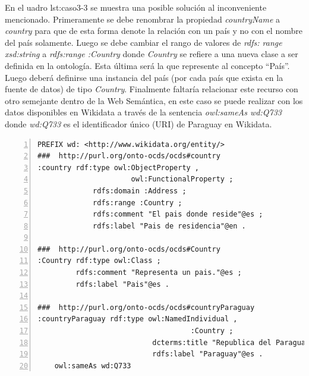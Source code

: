  En el uadro {lst:caso3-3} se muestra una posible solución al inconveniente mencionado. Primeramente se debe renombrar la propiedad \textit{countryName} a \textit{country} para que de esta forma denote la relación con un país y no con el nombre del país solamente. Luego se debe cambiar el rango de valores de \textit{rdfs: range xsd:string}  a \textit{rdfs:range :Country }donde \textit{Country} se refiere a una nueva clase a ser definida en la ontología. Esta última será la que represente al concepto “País”. Luego deberá definirse una instancia del país (por cada país que exista en la fuente de datos) de tipo \textit{Country}. Finalmente faltaría relacionar este recurso con otro semejante dentro de la Web Semántica, en este caso se puede realizar con los datos disponibles en Wikidata a través de la sentencia \textit{owl:sameAs wd:Q733} donde \textit{wd:Q733} es el identificador único (URI) de Paraguay en Wikidata.\hfill \break

\noindent\begin{minipage}[c]{\textwidth}
 \begin{lstlisting}[captionpos=b, caption=Declaracion de la Clase Country, label={lst:caso3-3},  numbers=left,  numberstyle=\tiny\color{mygray},
    basicstyle=\footnotesize\ttfamily,frame=single]
PREFIX wd: <http://www.wikidata.org/entity/>
###  http://purl.org/onto-ocds/ocds#country
:country rdf:type owl:ObjectProperty ,
                      owl:FunctionalProperty ;
             rdfs:domain :Address ;
             rdfs:range :Country ;
             rdfs:comment "El pais donde reside"@es ;
             rdfs:label "Pais de residencia"@en .

###  http://purl.org/onto-ocds/ocds#Country
:Country rdf:type owl:Class ;
         rdfs:comment "Representa un pais."@es ;
         rdfs:label "Pais"@es .

###  http://purl.org/onto-ocds/ocds#countryParaguay
:countryParaguay rdf:type owl:NamedIndividual ,
                                    :Country ;
                           dcterms:title "Republica del Paraguay"@es ;
                           rdfs:label "Paraguay"@es .
    owl:sameAs wd:Q733
 \end{lstlisting}
\end{minipage}
